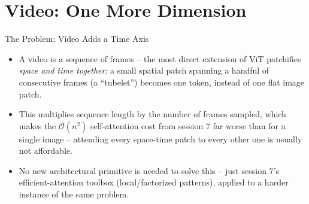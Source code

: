 
\section{Video: One More Dimension}

\begin{vbframe}{The Problem: Video Adds a Time Axis}
\begin{itemize}
  \item A video is a sequence of frames -- the most direct extension of ViT patchifies \emph{space and time together}: a small spatial patch spanning a handful of consecutive frames (a ``tubelet'') becomes one token, instead of one flat image patch.
  \item This multiplies sequence length by the number of frames sampled, which makes the $\mathcal{O}(n^2)$ self-attention cost from session 7 far worse than for a single image -- attending every space-time patch to every other one is usually not affordable.
  \item No new architectural primitive is needed to solve this -- just session 7's efficient-attention toolbox (local/factorized patterns), applied to a harder instance of the same problem.
\end{itemize}
\end{vbframe}

